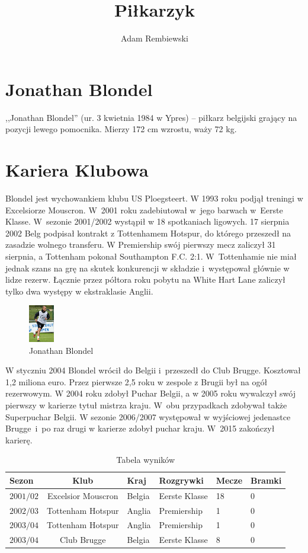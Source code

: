 \documentclass[a4paper,12pt]{article}
\title{Piłkarzyk}
\author{\texttildelow Adam Rembiewski}
\begin{document}
\maketitle
\section{Jonathan Blondel}
,,Jonathan Blondel'' (ur. 3 kwietnia 1984 w Ypres) – piłkarz belgijski grający na pozycji lewego pomocnika. Mierzy 172 cm wzrostu, waży 72 kg.
\section{Kariera Klubowa}
Blondel jest wychowankiem klubu US Ploegsteert. W 1993 roku podjął treningi w Excelsiorze Mouscron. W~2001 roku zadebiutował w~jego barwach w~Eerste Klasse. W~sezonie 2001/2002 wystąpił w 18 spotkaniach ligowych. 17 sierpnia 2002 Belg podpisał kontrakt z Tottenhamem Hotspur, do którego przeszedł na zasadzie wolnego transferu. W Premiership swój pierwszy mecz zaliczył 31 sierpnia, a Tottenham pokonał Southampton F.C. 2:1. W~Tottenhamie nie miał jednak szans na grę na skutek konkurencji w składzie i~występował głównie w lidze rezerw. Łącznie przez półtora roku pobytu na White Hart Lane zaliczył tylko dwa występy w ekstraklasie Anglii.
\begin{figure}
\begin{center}
\vspace{-20pt}
\includegraphics[width=0.1\textwidth,natwidth=165,natheight=240]{fotki/fotka.jpg}
\end{center}
\vspace{-20pt}
\caption{Jonathan Blondel}
\vspace{-10pt}
\end{figure}
W styczniu 2004 Blondel wrócił do Belgii i~przeszedł do Club Brugge. Kosztował 1,2 miliona euro. Przez pierwsze 2,5 roku w zespole z Brugii był na ogół rezerwowym. W 2004 roku zdobył Puchar Belgii, a w 2005 roku wywalczył swój pierwszy w karierze tytuł mistrza kraju. W~obu przypadkach zdobywał także Superpuchar Belgii. W sezonie 2006/2007 występował w wyjściowej jedenastce Brugge~i~po raz drugi w karierze zdobył puchar kraju. W~2015 zakończył karierę.
\begin{table}
\begin{tabular}{lcllll}
\hline
\textbf{Sezon}&\textbf{Klub}&\textbf{Kraj}&\textbf{Rozgrywki}&\textbf{Mecze}&\textbf{Bramki}\\
\hline
$2001/02$ & Excelsior Mouscron&Belgia&Eerste Klasse&18&0 \\
$2002/03$ & Tottenham Hotspur&Anglia&Premiership&1&0 \\
$2003/04$ & Tottenham Hotspur&Anglia&Premiership&1&0 \\
$2003/04$ & Club Brugge&Belgia&Eerste Klasse&8&0 \\
\hline
\end{tabular}
\caption{Tabela wyników}
\end{table}
\end{document}
